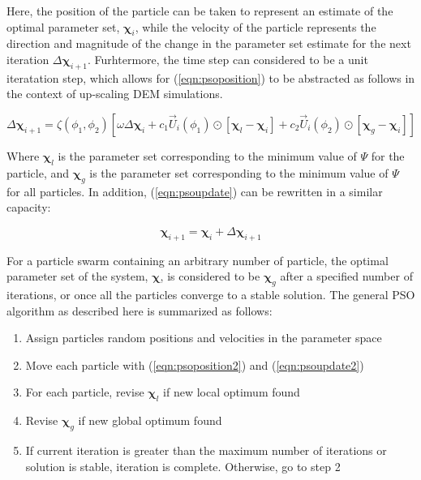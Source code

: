 Here, the position of the particle can be taken to represent an estimate of the optimal parameter set, $\boldsymbol{\chi}_i$, while the velocity of the particle represents the direction and magnitude of the change in the parameter set estimate for the next iteration $\Delta\boldsymbol{\chi}_{i+1}$. Furhtermore, the time step can considered to be a unit iteratation step, which allows for (\ref{eqn:psoposition}) to be abstracted as follows in the context of up-scaling DEM simulations.

\begin{equation}
\Delta\boldsymbol{\chi}_{i+1} = \zeta\left(\phi_1, \phi_2\right) \left[\omega\Delta\boldsymbol{\chi}_{i} + c_1\vec{U}_i\left(\phi_1\right)\odot\left[\boldsymbol{\chi}_l-\boldsymbol{\chi}_i\right] + c_2\vec{U}_i\left(\phi_2\right)\odot\left[\boldsymbol{\chi}_g-\boldsymbol{\chi}_i\right]\right]
\label{eqn:psoposition2}
\end{equation}

Where $\boldsymbol{\chi}_l$ is the parameter set corresponding to the minimum value of $\Psi$ for the particle, and $\boldsymbol{\chi}_g$ is the parameter set corresponding to the minimum value of $\Psi$ for all particles. In addition, (\ref{eqn:psoupdate}) can be rewritten in a similar capacity:

\begin{equation}
\boldsymbol{\chi}_{i+1}  = \boldsymbol{\chi}_{i}  +  \Delta\boldsymbol{\chi}_{i+1}
\label{eqn:psoupdate2}
\end{equation}

For a particle swarm containing an arbitrary number of particle, the optimal parameter set of the system, $\boldsymbol{\chi}$, is  considered to be $\boldsymbol{\chi}_g$ after a specified number of iterations, or once all the particles converge to a stable solution. The general PSO algorithm as described here is summarized as follows:

\begin{enumerate}
\item Assign particles random positions and velocities in the parameter space
\item Move each particle with (\ref{eqn:psoposition2}) and (\ref{eqn:psoupdate2})
\item For each particle, revise $\boldsymbol{\chi}_l$ if new local optimum found
\item Revise $\boldsymbol{\chi}_g$ if new global optimum found
\item If current iteration is greater than the maximum number of iterations or solution is stable, iteration is complete. Otherwise, go to step 2
\end{enumerate}

